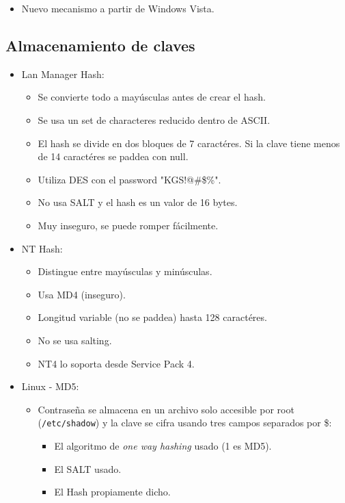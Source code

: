 \begin{itemize}
	\item Nuevo mecanismo a partir de Windows Vista.
\end{itemize}


\subsection{Almacenamiento de claves}

\begin{itemize}
	\item Lan Manager Hash: \begin{itemize}
		\item Se convierte todo a mayúsculas antes de crear el hash.
		\item Se usa un set de characteres reducido dentro de ASCII.
		\item El hash se divide en dos bloques de 7 caractéres. Si la clave tiene menos de 14
		caractéres se paddea con null.
		\item Utiliza DES con el password "KGS!@\#\$\%".
		\item No usa SALT y el hash es un valor de 16 bytes.
		\item Muy inseguro, se puede romper fácilmente.
	\end{itemize}
	\item NT Hash: \begin{itemize}
		\item Distingue entre mayúsculas y minúsculas.
		\item Usa MD4 (inseguro).
		\item Longitud variable (no se paddea) hasta 128 caractéres.
		\item No se usa salting.
		\item NT4 lo soporta desde Service Pack 4.
	\end{itemize}
	\item Linux - MD5: \begin{itemize}
		\item Contraseña se almacena en un archivo solo accesible por root (\texttt{/etc/shadow}) y la clave se
		cifra usando tres campos separados por \$:

		\begin{itemize}
			\item El algoritmo de \textit{one way hashing} usado (1 es MD5).
			\item El SALT usado.
			\item El Hash propiamente dicho.	
		\end{itemize}


\end{itemize}
\end{itemize}
